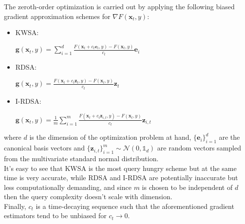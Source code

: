 The zeroth-order optimization is carried out by applying the following biased gradient approximation schemes for $\nabla F(\mathbf{x}_t,y)$:
\begin{itemize}
	\item KWSA:
	\begin{center}
		${\displaystyle\mathbf{g}(\mathbf{x}_t,y) = \sum^{d}_{i=1}\frac{F(\mathbf{x}_t + c_t\mathbf{e}_i,y)-F(\mathbf{x}_t,y)}{c_t}\mathbf{e}_i}$
	\end{center}
	\item RDSA:
	\begin{center}
		${\displaystyle\mathbf{g}(\mathbf{x}_t,y) = \frac{F(\mathbf{x}_t + c_t\mathbf{z}_t,y)-F(\mathbf{x}_t,y)}{c_t}\mathbf{z}_t}$
	\end{center}
	\item I-RDSA:
	\begin{center}
		${\displaystyle\mathbf{g}(\mathbf{x}_t,y) = \frac{1}{m}\sum^{m}_{i=1}\frac{F(\mathbf{x}_t + c_t\mathbf{z}_{i,t},y)-F(\mathbf{x}_t,y)}{c_t}\mathbf{z}_{i,t}}$
	\end{center}
\end{itemize}
where $d$ is the dimension of the optimization problem at hand, $\{\mathbf{e}_i\}_{i=1}^d$ are the canonical basis vectors and $\{\mathbf{z}_{i,t}\}_{i=1}^m\sim\mathcal{N}(0,\mathbb{1}_d)$ are random vectors sampled from the multivariate standard normal distribution.\\
It's easy to see that KWSA is the most query hungry scheme but at the same time is very accurate, while RDSA and I-RDSA are potentially inaccurate but less computationally demanding, and since $m$ is chosen to be independent of $d$ then the query complexity doesn't scale with dimension.\\
Finally, $c_t$ is a time-decaying sequence such that the aforementioned gradient estimators tend to be unbiased for $c_t \rightarrow 0$.\\

